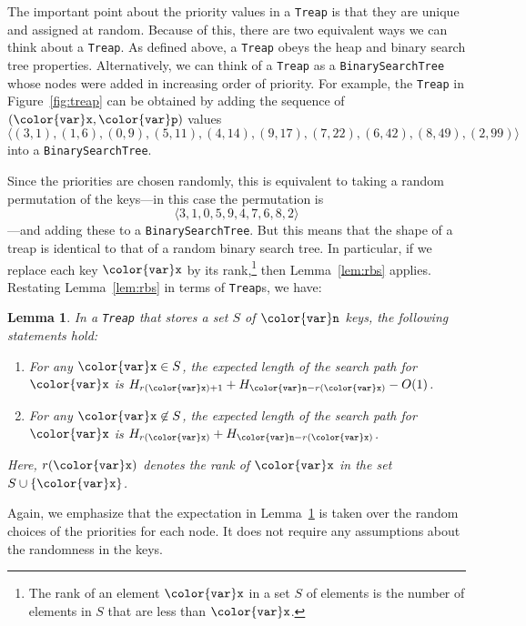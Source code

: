 \documentclass[10pt]{book}
\newcommand{\figref}[1]{Figure~\ref{fig:#1}}
\theoremstyle{plain}
\newtheorem{lem}{Lemma}[chapter]
\newcommand{\lemlabel}[1]{\label{lem:#1}}
\newcommand{\lemref}[1]{Lemma~\ref{lem:#1}}
\theoremstyle{definition}
\begin{document}
The important point about the priority values in a \texttt{Treap} is that they
are unique and assigned at random.  Because of this, there are
two equivalent ways we can think about a \texttt{Treap}.  As defined above, a
\texttt{Treap} obeys the heap and binary search tree properties.  Alternatively,
we can think of a \texttt{Treap} as a \texttt{BinarySearchTree} whose nodes
were added in increasing order of priority.  For example, the \texttt{Treap}
in \figref{treap} can be obtained by adding the sequence of $(\ensuremath{\mathtt{{\color{var}x}}},\ensuremath{\mathtt{{\color{var}p}}})$
values 
\[
  \langle
   (3,1), (1,6), (0,9), (5,11), (4,14), (9,17), (7,22), (6,42), (8,49), (2,99)
  \rangle
\]
into a \texttt{BinarySearchTree}.

Since the priorities are chosen randomly, this is equivalent to taking a
random permutation of the keys---in this case the permutation is
\[
  \langle 3, 1, 0, 5, 9, 4, 7, 6, 8, 2 \rangle
\]
---and adding these to a \texttt{BinarySearchTree}.  But this means that the
shape of a treap is identical to that of a random binary search tree.
In particular, if we replace each key \ensuremath{\mathtt{{\color{var}x}}} by its rank,\footnote{The
rank of an element \ensuremath{\mathtt{{\color{var}x}}} in a set $S$ of elements is the number of
elements in $S$ that are less than \ensuremath{\mathtt{{\color{var}x}}}.} then \lemref{rbs} applies.
Restating \lemref{rbs} in terms of \texttt{Treap}s, we have:
\begin{lem}\lemlabel{rbs-treap}
  In a \texttt{Treap} that stores a set $S$ of \ensuremath{\mathtt{{\color{var}n}}} keys, the following statements hold:
  \begin{enumerate}
    \item For any $\ensuremath{\mathtt{{\color{var}x}}}\in S$, the expected length of
    the search path for \ensuremath{\mathtt{{\color{var}x}}} is $H_{r(\ensuremath{\mathtt{{\color{var}x}}})+1} + H_{\ensuremath{\mathtt{{\color{var}n}}}-r(\ensuremath{\mathtt{{\color{var}x}}})} - O(1)$.
    \item For any $\ensuremath{\mathtt{{\color{var}x}}}\not\in S$, the expected length of the
    search path for \ensuremath{\mathtt{{\color{var}x}}} is $H_{r(\ensuremath{\mathtt{{\color{var}x}}})} + H_{\ensuremath{\mathtt{{\color{var}n}}}-r(\ensuremath{\mathtt{{\color{var}x}}})}$.
  \end{enumerate}
  Here, $r(\ensuremath{\mathtt{{\color{var}x}}})$ denotes the rank of \ensuremath{\mathtt{{\color{var}x}}} in the set $S\cup\{\ensuremath{\mathtt{{\color{var}x}}}\}$.
\end{lem}
Again, we emphasize that the expectation in \lemref{rbs-treap} is taken
over the random choices of the priorities for each node.  It does not
require any assumptions about the randomness in the keys.
\end{document}
